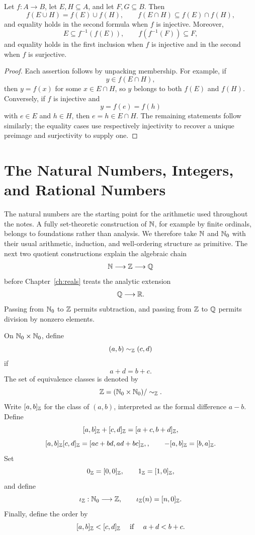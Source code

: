 \begin{proposition}
\label{prop:image-inverse-image-rules}
Let $f:A\to B$, let $E,H\subseteq A$, and let $F,G\subseteq B$. Then
\[
f(E\cup H)=f(E)\cup f(H),
\qquad
f(E\cap H)\subseteq f(E)\cap f(H),
\]
and equality holds in the second formula when $f$ is injective. Moreover,
\[
E\subseteq f^{-1}(f(E)),
\qquad
f(f^{-1}(F))\subseteq F,
\]
and equality holds in the first inclusion when $f$ is injective and in the second when $f$ is surjective.
\end{proposition}
\begin{proof}
Each assertion follows by unpacking membership. For example, if
\[
y\in f(E\cap H),
\]
then $y=f(x)$ for some $x\in E\cap H$, so $y$ belongs to both $f(E)$ and $f(H)$. Conversely, if $f$ is injective and
\[
y=f(e)=f(h)
\]
with $e\in E$ and $h\in H$, then $e=h\in E\cap H$. The remaining statements follow similarly; the equality cases use respectively injectivity to recover a unique preimage and surjectivity to supply one.
\end{proof}

\section{The Natural Numbers, Integers, and Rational Numbers}

The natural numbers are the starting point for the arithmetic used throughout
the notes.  A fully set-theoretic construction of \(\mathbb{N}\), for example by
finite ordinals, belongs to foundations rather than analysis.  We therefore
take \(\mathbb{N}\) and \(\mathbb{N}_0\) with their usual arithmetic, induction, and
well-ordering structure as primitive.  The next two quotient constructions
explain the algebraic chain
\[
\mathbb{N}\longrightarrow\mathbb{Z}\longrightarrow\mathbb{Q}
\]
before Chapter~\ref{ch:reals} treats the analytic extension
\[
\mathbb{Q}\longrightarrow\mathbb{R}.
\]
Passing from \(\mathbb{N}_0\) to \(\mathbb{Z}\) permits subtraction, and passing from \(\mathbb{Z}\)
to \(\mathbb{Q}\) permits division by nonzero elements.

\begin{definition}
On \(\mathbb{N}_0\times\mathbb{N}_0\), define
\[
(a,b)\sim_{\mathbb{Z}}(c,d)
\]
if
\[
a+d=b+c.
\]
The set of equivalence classes is denoted by
\[
\mathbb{Z}=(\mathbb{N}_0\times\mathbb{N}_0)/\sim_{\mathbb{Z}}.
\]
Write \([a,b]_{\mathbb{Z}}\) for the class of \((a,b)\), interpreted as the formal
difference \(a-b\).  Define
\[
[a,b]_{\mathbb{Z}}+[c,d]_{\mathbb{Z}}=[a+c,b+d]_{\mathbb{Z}},
\]
\[
[a,b]_{\mathbb{Z}}[c,d]_{\mathbb{Z}}=[ac+bd,ad+bc]_{\mathbb{Z}},,\qquad -[a,b]_{\mathbb{Z}}=[b,a]_{\mathbb{Z}}.
\]
Set
\[
0_{\mathbb{Z}}=[0,0]_{\mathbb{Z}},
\qquad
1_{\mathbb{Z}}=[1,0]_{\mathbb{Z}},
\]
and define
\[
\iota_{\mathbb{Z}}:\mathbb{N}_0\longrightarrow\mathbb{Z},
\qquad
\iota_{\mathbb{Z}}(n)=[n,0]_{\mathbb{Z}}.
\]
Finally, define the order by
\[
[a,b]_{\mathbb{Z}}< [c,d]_{\mathbb{Z}}
\quad\text{ if }\quad
a+d<b+c.
\]
\end{definition}

